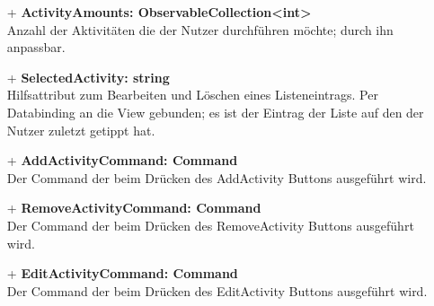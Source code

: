 \documentclass[a4paper,12pt]{article}
\begin{document}
\begin{itemize}
	\item[+] \textbf{ActivityAmounts: ObservableCollection<int>} \\ Anzahl der Aktivitäten die der Nutzer durchführen möchte; durch ihn anpassbar. 
	\item[+] \textbf{SelectedActivity: string} \\ Hilfsattribut zum Bearbeiten und Löschen eines Listeneintrags. Per Databinding an die View gebunden; es ist der Eintrag der Liste auf den der Nutzer zuletzt getippt hat. 
	\item[+] \textbf{AddActivityCommand: Command} \\ Der Command der beim Drücken des AddActivity Buttons ausgeführt wird. 
	\item[+] \textbf{RemoveActivityCommand: Command} \\ Der Command der beim Drücken des RemoveActivity Buttons ausgeführt wird. 
	\item[+] \textbf{EditActivityCommand: Command} \\ Der Command der beim Drücken des EditActivity Buttons ausgeführt wird. 
\end{itemize}
\end{document}
